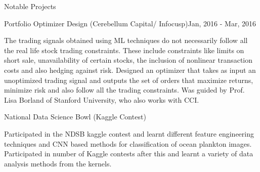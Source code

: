 \documentclass{resume} %
\begin{document}
\begin{rSection}{Notable Projects}
			\begin{rSubsection}{Portfolio Optimizer Design  (Cerebellum Capital/ Infocusp)}{Jan, 2016 - Mar, 2016}{}{}	{}
			\item The trading signals obtained using ML techniques do not necessarily follow all the real life stock trading constraints. These include constraints like limits on short sale, unavailability of certain stocks, the inclusion of nonlinear transaction costs and also hedging against risk. Designed an optimizer that takes as input an unoptimized trading signal and outputs the set of orders that maximize returns, minimize risk and also follow all the trading constraints. Was guided by Prof. Lisa Borland of Stanford University, who also works with CCI.
			\end{rSubsection}
			\vspace{0.1 in}
			
			\begin{rSubsection}{National Data Science Bowl (Kaggle Contest)}{}{}{}	{}
			\item Participated in the NDSB kaggle contest and learnt different feature engineering techniques and CNN based methods for classification of ocean plankton images. Participated in number of Kaggle contests after this and learnt a variety of data analysis methods from the kernels.
			\end{rSubsection}
			
			\vspace{0.1 in}
		\end{rSection}
		
\end{document}
